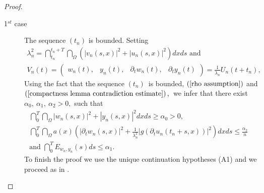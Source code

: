 \documentclass[11pt,reqno]{amsart}
\theoremstyle{plain}
\numberwithin{equation}{section}
\numberwithin{equation}{section}
\begin{document}
\begin{proof}
\begin{description}
\item[1$^{st}$ case] The sequence $\left( t_{n}\right) $ is bounded. Setting%
\begin{equation*}
\begin{array}{l}
\lambda _{n}^{2}=\dint_{t_{n}}^{t_{n}+T}\dint_{\Omega }\left( \left\vert
v_{n}\left( s,x\right) \right\vert ^{2}+\left\vert u_{n}\left( s,x\right)
\right\vert ^{2}\right) dxds\text{ \ and } \\ 
V_{n}\left( t\right) =\left( 
\begin{array}{cccc}
w_{n}\left( t\right) , & y_{n}\left( t\right) , & \partial _{t}w_{n}\left(
t\right) , & \partial _{t}y_{n}\left( t\right)%
\end{array}%
\right) =\frac{1}{\lambda _{n}}U_{n}\left( t+t_{n}\right) ,%
\end{array}%
\end{equation*}%
Using the fact that the sequence $\left( t_{n}\right) $\ is bounded, $\left( %
\ref{rho assumption}\right) $ and $\left( \ref{compactness lemma
contradiction estimate}\right) ,$\ we infer that there exist $\alpha
_{0},~\alpha _{1},~\alpha _{2}>0,$ such that%
\begin{equation*}
\begin{array}{l}
\dint_{0}^{T}\dint_{\Omega }\left\vert w_{n}\left( s,x\right) \right\vert
^{2}+\left\vert y_{n}\left( s,x\right) \right\vert ^{2}dxds\geq \alpha
_{0}>0, \\ 
\dint_{0}^{T}\dint_{\Omega }a\left( x\right) \left( \left\vert \partial
_{t}w_{n}\left( s,x\right) \right\vert ^{2}+\frac{1}{\lambda _{n}^{2}}%
\left\vert g\left( \partial _{t}u_{n}\left( t_{n}+s,x\right) \right)
\right\vert ^{2}\right) dxds\leq \frac{\alpha _{2}}{n}\text{ } \\ 
\text{and }\dint_{0}^{T}E_{w_{n},y_{n}}\left( s\right) ds\leq \alpha _{1}.%
\end{array}%
\end{equation*}%
To finish the proof we use the unique continuation hypotheses (A1) and we
proceed as in \cite[Proof of lemma 7]{Aloui-daou}.


\end{description}
\end{proof}
\end{document}
